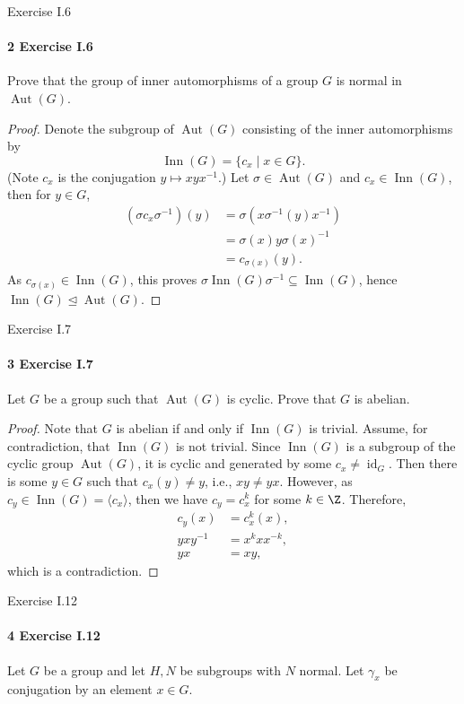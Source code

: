 \documentclass[12pt]{article}
\newlength{\myparskip}
\newenvironment{fullbox}{\begin{lrbox}{\savefullbox}\begin{minipage}{\dimexpr\textwidth-2\fboxsep\relax}\setlength{\parskip}{\myparskip}}{\end{minipage}\end{lrbox}\framebox[\textwidth]{\usebox{\savefullbox}}}
\newenvironment{pbox}[1][]{\begin{fullbox}\ifx#1\empty\else\paragraph{#1}\fi}{\end{fullbox}}
\newcommand{\<}{\langle}
\renewcommand{\>}{\rangle}
\DeclareMathOperator{\id}{id}
\DeclareMathOperator{\Aut}{Aut}
\DeclareMathOperator{\Inn}{Inn}
\newcommand{\teq}{\trianglelefteq}
\begin{document}
\begin{pbox}[2 Exercise I.6]
    Prove that the group of inner automorphisms of a group $G$ is normal in $\Aut(G)$.
\end{pbox}

\begin{proof}
    Denote the subgroup of $\Aut(G)$ consisting of the inner automorphisms by
    \[
        \Inn(G) = \{c_x \mid x \in G\}.
    \]
    (Note $c_x$ is the conjugation $y \mapsto xyx^{-1}$.) Let $\sigma \in \Aut(G)$ and $c_x \in \Inn(G)$, then for $y \in G$,
    \begin{align*}
        (\sigma c_x \sigma^{-1})(y)
            &= \sigma(x \sigma^{-1}(y) x^{-1}) \\
            &= \sigma(x) y \sigma(x)^{-1} \\
            &= c_{\sigma(x)}(y).
    \end{align*}
    As $c_{\sigma(x)} \in \Inn(G)$, this proves $\sigma\Inn(G)\sigma^{-1} \subseteq \Inn(G)$, hence $\Inn(G) \teq \Aut(G)$.
    

\end{proof}



\newpage
\begin{pbox}[3 Exercise I.7]
    Let $G$ be a group such that $\Aut(G)$ is cyclic. Prove that $G$ is abelian.
\end{pbox}

\begin{proof}
    Note that $G$ is abelian if and only if $\Inn(G)$ is trivial. Assume, for contradiction, that $\Inn(G)$ is not trivial. Since $\Inn(G)$ is a subgroup of the cyclic group $\Aut(G)$, it is cyclic and generated by some $c_x \ne \id_G$. Then there is some $y \in G$ such that $c_x(y) \ne y$, i.e., $xy \ne yx$. However, as $c_y \in \Inn(G) = \<c_x\>$, then we have $c_y = c_x^{k}$ for some $k \in \Z$. Therefore,
    \begin{align*}
        c_y(x) &= c_x^k(x), \\
        yxy^{-1} &= x^kxx^{-k}, \\
        yx &= xy,
    \end{align*}
    which is a contradiction.

\end{proof}



\newpage
\begin{pbox}[4 Exercise I.12]
    Let $G$ be a group and let $H, N$ be subgroups with $N$ normal. Let $\gamma_x$ be conjugation by an element $x \in G$.
\end{pbox}
\end{document}
